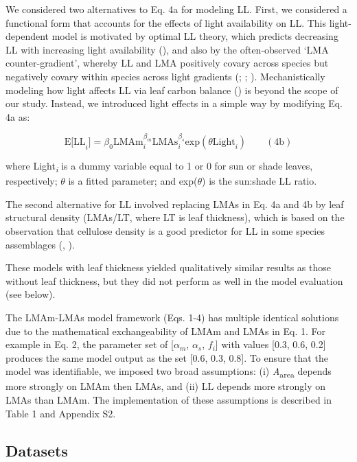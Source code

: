 \documentclass[
  12pt,
  letterpaper,
  DIV=11,
  numbers=noendperiod]{scrartcl}
\begin{document}
We considered two alternatives to Eq. 4a for modeling LL. First, we
considered a functional form that accounts for the effects of light
availability on LL. This light-dependent model is motivated by optimal
LL theory, which predicts decreasing LL with increasing light
availability (), and also by
the often-observed `LMA counter-gradient', whereby LL and LMA positively
covary across species but negatively covary within species across light
gradients (;
;
). Mechanistically
modeling how light affects LL via leaf carbon balance
() is beyond the scope of our
study. Instead, we introduced light effects in a simple way by modifying
Eq. 4a as:

\[
\mathrm{E[LL}_i] = \beta_0\mathrm{LMAm}_{i}^{\beta_m} \mathrm{LMAs}_{i}^{\beta_s} \mathrm{exp}(\theta \mathrm{Light}_i) \qquad(4\mathrm{b})
\]

where Light\textsubscript{\emph{i}} is a dummy variable equal to 1 or 0
for sun or shade leaves, respectively; \(\theta\) is a fitted parameter;
and exp(\(\theta\)) is the sun:shade LL ratio.

The second alternative for LL involved replacing LMAs in Eq. 4a and 4b
by leaf structural density (LMAs/LT, where LT is leaf thickness), which
is based on the observation that cellulose density is a good predictor
for LL in some species assemblages (, ).

These models with leaf thickness yielded qualitatively similar results
as those without leaf thickness, but they did not perform as well in the
model evaluation (see below).

The LMAm-LMAs model framework (Eqs. 1-4) has multiple identical
solutions due to the mathematical exchangeability of LMAm and LMAs in
Eq. 1. For example in Eq. 2, the parameter set of {[}\(\alpha_m\),
\(\alpha_s\), \(f_i\){]} with values {[}0.3, 0.6, 0.2{]} produces the
same model output as the set {[}0.6, 0.3, 0.8{]}. To ensure that the
model was identifiable, we imposed two broad assumptions: (i)
\emph{A}\textsubscript{area} depends more strongly on LMAm then LMAs,
and (ii) LL depends more strongly on LMAs than LMAm. The implementation
of these assumptions is described in Table 1 and Appendix S2.

\subsection{Datasets}\label{datasets}
\end{document}
